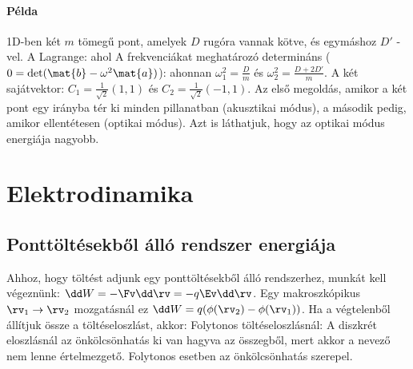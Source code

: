    \paragraph{Példa}
    
    1D-ben két $m$ tömegű pont, amelyek $D$ rugóra vannak kötve, és egymáshoz $D'$ -vel.
   A Lagrange:
    ahol 
    A frekvenciákat meghatározó determináns ($0=\det(\mat{b}-\omega^2\mat{a})$):
    ahonnan $\omega_1^2=\frac{D}{m}$ és $\omega_2^2=\frac{D+2D'}{m}$.
   A két sajátvektor: $C_1=\frac{1}{\sqrt{2}}\left(1,1\right)$ és $C_2=\frac{1}{\sqrt{2}}\left(-1,1\right)$.
   Az első megoldás, amikor a két pont egy irányba tér ki minden pillanatban (akusztikai módus), a második pedig, amikor ellentétesen (optikai módus).
   Azt is láthatjuk, hogy az optikai módus energiája nagyobb.
    
 \section{Elektrodinamika}
  
  \subsection{Ponttöltésekből álló rendszer energiája}
   
   Ahhoz, hogy töltést adjunk egy ponttöltésekből álló rendszerhez, munkát kell végeznünk: $\dd W=-\Fv \dd \rv=-q\Ev\dd\rv$.
   Egy makroszkópikus $\rv_1\to\rv_2$ mozgatásnál ez $\dd W=q(\phi(\rv_2)-\phi(\rv_1))$.
   Ha a végtelenből állítjuk össze a töltéseloszlást, akkor:
   Folytonos töltéseloszlásnál:
   A diszkrét eloszlásnál az önkölcsönhatás ki van hagyva az összegből, mert akkor a nevező nem lenne értelmezgető.
   Folytonos esetben az önkölcsönhatás szerepel.
   

